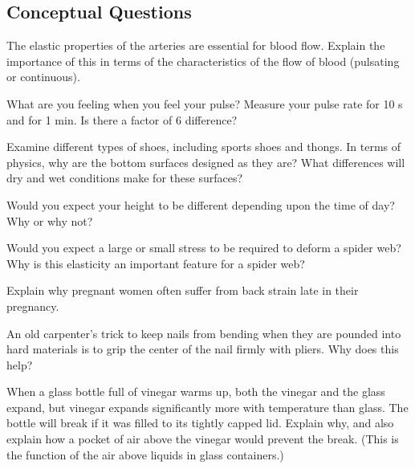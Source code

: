 \documentclass[
]{book}
\begin{document}
\hypertarget{fs-id1165298807240}{}
\hypertarget{conceptual-questions-20}{%
\subsection{Conceptual Questions}\label{conceptual-questions-20}}

\hypertarget{fs-id1165298797418}{}
\leavevmode{}%
The elastic properties of the arteries are essential for blood flow.
Explain the importance of this in terms of the characteristics of the
flow of blood (pulsating or continuous).

\hypertarget{fs-id1165298867810}{}
\leavevmode{}%
What are you feeling when you feel your pulse? Measure your pulse rate
for 10 s and for 1 min. Is there a factor of 6 difference?

\hypertarget{fs-id1165296252981}{}
\leavevmode{}%
Examine different types of shoes, including sports shoes and thongs. In
terms of physics, why are the bottom surfaces designed as they are? What
differences will dry and wet conditions make for these surfaces?

\hypertarget{fs-id1165298840083}{}
\leavevmode{}%
Would you expect your height to be different depending upon the time of
day? Why or why not?

\hypertarget{fs-id1165298650751}{}
\leavevmode{}%
Would you expect a large or small stress to be required to deform a
spider web? Why is this elasticity an important feature for a spider
web?

\hypertarget{fs-id1165298550516}{}
\leavevmode{}%
Explain why pregnant women often suffer from back strain late in their
pregnancy.

\hypertarget{fs-id1165298545438}{}
\leavevmode{}%
An old carpenter's trick to keep nails from bending when they are
pounded into hard materials is to grip the center of the nail firmly
with pliers. Why does this help?

\hypertarget{fs-id1165298771893}{}
\leavevmode{}%
When a glass bottle full of vinegar warms up, both the vinegar and the
glass expand, but vinegar expands significantly more with temperature
than glass. The bottle will break if it was filled to its tightly capped
lid. Explain why, and also explain how a pocket of air above the vinegar
would prevent the break. (This is the function of the air above liquids
in glass containers.)
\end{document}
